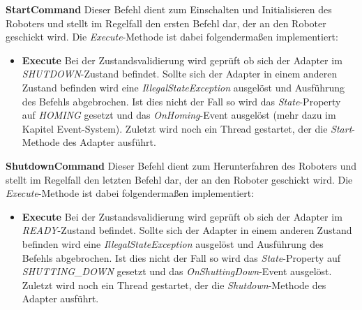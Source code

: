 \textbf{StartCommand}
\newline
Dieser Befehl dient zum Einschalten und Initialisieren des Roboters und stellt im Regelfall den ersten Befehl dar, der an den Roboter geschickt wird. Die \textit{Execute}-Methode ist dabei folgendermaßen implementiert:
\begin{itemize}
\item \textbf{Execute}
\newline
Bei der Zustandsvalidierung wird geprüft ob sich der Adapter im \textit{SHUTDOWN}-Zustand befindet. Sollte sich der Adapter in einem anderen Zustand befinden wird eine \textit{IllegalStateException} ausgelöst und Ausführung des Befehls abgebrochen. Ist dies nicht der Fall so wird das \textit{State}-Property auf \textit{HOMING} gesetzt und das \textit{OnHoming}-Event ausgelöst (mehr dazu im Kapitel Event-System). Zuletzt wird noch ein Thread gestartet, der die \textit{Start}-Methode des Adapter ausführt.
\end{itemize}

\textbf{ShutdownCommand}
\newline
Dieser Befehl dient zum Herunterfahren des Roboters und stellt im Regelfall den letzten Befehl dar, der an den Roboter geschickt wird. Die \textit{Execute}-Methode ist dabei folgendermaßen implementiert:
\begin{itemize}
\item \textbf{Execute}
\newline
Bei der Zustandsvalidierung wird geprüft ob sich der Adapter im \textit{READY}-Zustand befindet. Sollte sich der Adapter in einem anderen Zustand befinden wird eine \textit{IllegalStateException} ausgelöst und Ausführung des Befehls abgebrochen. Ist dies nicht der Fall so wird das \textit{State}-Property auf \textit{SHUTTING\_DOWN} gesetzt und das \textit{OnShuttingDown}-Event ausgelöst. Zuletzt wird noch ein Thread gestartet, der die \textit{Shutdown}-Methode des Adapter ausführt.
\end{itemize}

